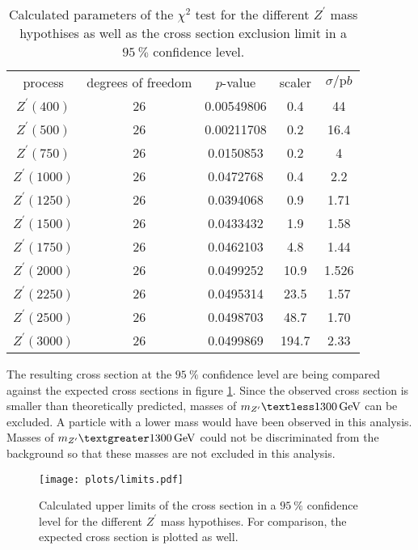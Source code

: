 \begin{table}
  \centering
  \caption{Calculated parameters of the $\chi^2$ test for the different  $Z^\prime$ mass hypothises as well as the cross section exclusion limit in a  $\SI{95}{\percent}$ confidence level.}
  \label{tab:chi2}
  \begin{tabular}{c|cccc}
    \toprule
    process & degrees of freedom & $p$-value & scaler & $\sigma / \si{\pico b}$ \\
    $Z^\prime (400)$  & 26 & 0.00549806 & 0.4 & 44 \\
    $Z^\prime (500)$  & 26 & 0.00211708 & 0.2 & 16.4 \\
    $Z^\prime (750)$  & 26 & 0.0150853  & 0.2 & 4 \\
    $Z^\prime (1000)$ & 26 & 0.0472768 & 0.4 & 2.2 \\
    $Z^\prime (1250)$ & 26 & 0.0394068 & 0.9 & 1.71 \\
    $Z^\prime (1500)$ & 26 & 0.0433432 & 1.9 & 1.58 \\
    $Z^\prime (1750)$ & 26 & 0.0462103 & 4.8 & 1.44 \\
    $Z^\prime (2000)$ & 26 & 0.0499252 & 10.9 & 1.526 \\
    $Z^\prime (2250)$ & 26 & 0.0495314 & 23.5 & 1.57 \\
    $Z^\prime (2500)$ & 26 & 0.0498703 & 48.7 & 1.70 \\
    $Z^\prime (3000)$ & 26 & 0.0499869  & 194.7 & 2.33 \\
    \midrule
    \bottomrule
  \end{tabular}
\end{table}

The resulting cross section at the $\SI{95}{\percent}$ confidence level are being compared against the expected cross sections in figure \ref{fig:limit}.
Since the observed cross section is smaller than theoretically predicted, masses of $m_{Z^\prime} \textless \SI{1300}{\giga\electronvolt}$ can be excluded.
A particle with a lower mass would have been observed in this analysis.
Masses of $m_{Z^\prime} \textgreater \SI{1300}{\giga\electronvolt}$ could not be discriminated from the background so that these masses are not excluded in this analysis.

\begin{figure}
    \centering
    \texttt{[image: plots/limits.pdf]}
    \caption{Calculated upper limits of the cross section in a $\SI{95}{\percent}$ confidence level for the different $Z^\prime$ mass hypothises. For comparison, the expected cross section is plotted as well.}
    \label{fig:limit}
\end{figure}
